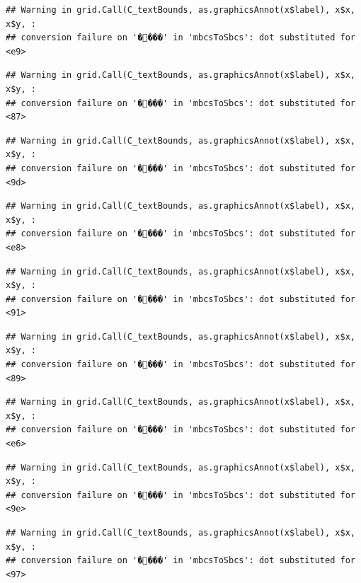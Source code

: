 \documentclass[
]{article}
\begin{document}
\begin{verbatim}
## Warning in grid.Call(C_textBounds, as.graphicsAnnot(x$label), x$x, x$y, :
## conversion failure on '����' in 'mbcsToSbcs': dot substituted for <e9>
\end{verbatim}

\begin{verbatim}
## Warning in grid.Call(C_textBounds, as.graphicsAnnot(x$label), x$x, x$y, :
## conversion failure on '����' in 'mbcsToSbcs': dot substituted for <87>
\end{verbatim}

\begin{verbatim}
## Warning in grid.Call(C_textBounds, as.graphicsAnnot(x$label), x$x, x$y, :
## conversion failure on '����' in 'mbcsToSbcs': dot substituted for <9d>
\end{verbatim}

\begin{verbatim}
## Warning in grid.Call(C_textBounds, as.graphicsAnnot(x$label), x$x, x$y, :
## conversion failure on '����' in 'mbcsToSbcs': dot substituted for <e8>
\end{verbatim}

\begin{verbatim}
## Warning in grid.Call(C_textBounds, as.graphicsAnnot(x$label), x$x, x$y, :
## conversion failure on '����' in 'mbcsToSbcs': dot substituted for <91>
\end{verbatim}

\begin{verbatim}
## Warning in grid.Call(C_textBounds, as.graphicsAnnot(x$label), x$x, x$y, :
## conversion failure on '����' in 'mbcsToSbcs': dot substituted for <89>
\end{verbatim}

\begin{verbatim}
## Warning in grid.Call(C_textBounds, as.graphicsAnnot(x$label), x$x, x$y, :
## conversion failure on '����' in 'mbcsToSbcs': dot substituted for <e6>
\end{verbatim}

\begin{verbatim}
## Warning in grid.Call(C_textBounds, as.graphicsAnnot(x$label), x$x, x$y, :
## conversion failure on '����' in 'mbcsToSbcs': dot substituted for <9e>
\end{verbatim}

\begin{verbatim}
## Warning in grid.Call(C_textBounds, as.graphicsAnnot(x$label), x$x, x$y, :
## conversion failure on '����' in 'mbcsToSbcs': dot substituted for <97>
\end{verbatim}
\end{document}

